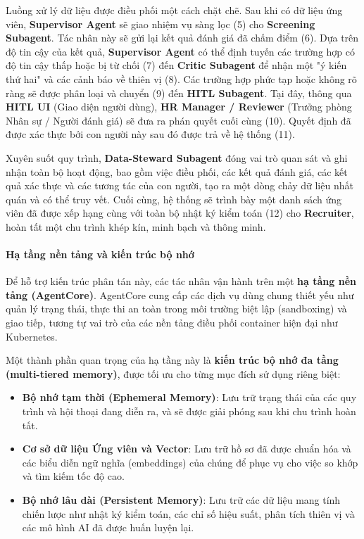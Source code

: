 \documentclass{article}
\begin{document}
\begin{itemize}[topsep=0pt, itemsep=4pt, leftmargin=40pt]
Luồng xử lý dữ liệu được điều phối một cách chặt chẽ. Sau khi có dữ liệu ứng viên, \textbf{Supervisor Agent} sẽ giao nhiệm vụ sàng lọc (5) cho \textbf{Screening Subagent}. Tác nhân này sẽ gửi lại kết quả đánh giá đã chấm điểm (6). Dựa trên độ tin cậy của kết quả, \textbf{Supervisor Agent} có thể định tuyến các trường hợp có độ tin cậy thấp hoặc bị từ chối (7) đến \textbf{Critic Subagent} để nhận một "ý kiến thứ hai" và các cảnh báo về thiên vị (8). Các trường hợp phức tạp hoặc không rõ ràng sẽ được phân loại và chuyển (9) đến \textbf{HITL Subagent}. Tại đây, thông qua \textbf{HITL UI} (Giao diện người dùng), \textbf{HR Manager / Reviewer} (Trưởng phòng Nhân sự / Người đánh giá) sẽ đưa ra phán quyết cuối cùng (10). Quyết định đã được xác thực bởi con người này sau đó được trả về hệ thống (11).

Xuyên suốt quy trình, \textbf{Data-Steward Subagent} đóng vai trò quan sát và ghi nhận toàn bộ hoạt động, bao gồm việc điều phối, các kết quả đánh giá, các kết quả xác thực và các tương tác của con người, tạo ra một dòng chảy dữ liệu nhất quán và có thể truy vết. Cuối cùng, hệ thống sẽ trình bày một danh sách ứng viên đã được xếp hạng cùng với toàn bộ nhật ký kiểm toán (12) cho \textbf{Recruiter}, hoàn tất một chu trình khép kín, minh bạch và thông minh.

\paragraph{Hạ tầng nền tảng và kiến trúc bộ nhớ}
Để hỗ trợ kiến trúc phân tán này, các tác nhân vận hành trên một \textbf{hạ tầng nền tảng (AgentCore)}. AgentCore cung cấp các dịch vụ dùng chung thiết yếu như quản lý trạng thái, thực thi an toàn trong môi trường biệt lập (sandboxing) và giao tiếp, tương tự vai trò của các nền tảng điều phối container hiện đại như Kubernetes.

Một thành phần quan trọng của hạ tầng này là \textbf{kiến trúc bộ nhớ đa tầng (multi-tiered memory)}, được tối ưu cho từng mục đích sử dụng riêng biệt:
\begin{itemize}[topsep=0pt, itemsep=4pt, leftmargin=40pt]
    \item \textbf{Bộ nhớ tạm thời (Ephemeral Memory)}: Lưu trữ trạng thái của các quy trình và hội thoại đang diễn ra, và sẽ được giải phóng sau khi chu trình hoàn tất.
    \item \textbf{Cơ sở dữ liệu Ứng viên và Vector}: Lưu trữ hồ sơ đã được chuẩn hóa và các biểu diễn ngữ nghĩa (embeddings) của chúng để phục vụ cho việc so khớp và tìm kiếm tốc độ cao.
    \item \textbf{Bộ nhớ lâu dài (Persistent Memory)}: Lưu trữ các dữ liệu mang tính chiến lược như nhật ký kiểm toán, các chỉ số hiệu suất, phân tích thiên vị và các mô hình AI đã được huấn luyện lại.
\end{itemize}


\end{itemize}
\end{document}
